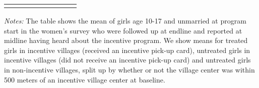 \begin{table}[H]
\begin{adjustwidth}{-0.5cm}{-0.5cm}
\begin{adjustbox}{width= 1\textwidth}
\begin{threeparttable}
	    \begin{tabular}{L{7cm} L{0.000001cm} C{5.5cm} L{0.000001cm} C{5.5cm} L{0.000001cm} C{5.5cm} L{0.000001cm} C{5.5cm}}
		\bottomrule
		&& && && && \\
		\end{tabular}
		\vspace{-0.5cm}
		\begin{tablenotes}		
\item \textit{Notes:} The table shows the mean of girls age 10-17 and unmarried at program start in the women's survey who were followed up at endline and reported at midline having heard about the incentive program. We show means for treated girls in incentive villages (received an incentive pick-up card), untreated girls in incentive villages (did not receive an incentive pick-up card) and untreated girls in non-incentive villages, split up by whether or not the village center was within 500 meters of an incentive village center at baseline.
	    \end{tablenotes}				
\end{threeparttable}
\end{adjustbox}
\end{adjustwidth}
\end{table}		
